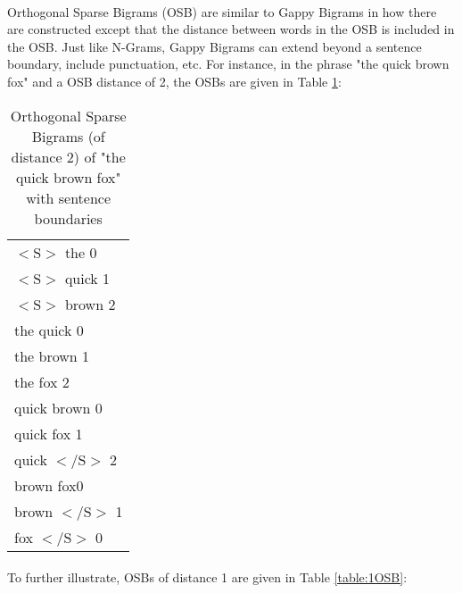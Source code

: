 		\paragraph{} Orthogonal Sparse Bigrams (OSB) are similar to Gappy Bigrams in how there are constructed except that the distance between words in the OSB is included in the OSB. Just like N-Grams, Gappy Bigrams can extend beyond a sentence boundary, include punctuation, etc. For instance, in the phrase "the quick brown fox" and a OSB distance of 2, the OSBs are given in Table \ref{table:2OSB}:
		\begin{center}
			\begin{table}[h]
			\caption{Orthogonal Sparse Bigrams (of distance 2) of "the quick brown fox" with sentence boundaries}
			\label{table:2OSB}
				\begin{center}
					\begin{tabular}{l}
					$<\text{S}>$ the 0\\
					$<\text{S}>$ quick 1\\
					$<\text{S}>$ brown 2\\
					the quick 0\\
					the brown 1\\
					the fox 2\\
					quick brown 0\\
					quick fox 1\\
					quick $<\text{/S}>$ 2\\
					brown fox0\\
					brown $<\text{/S}>$ 1\\
					fox $<\text{/S}>$ 0\\
					\end{tabular}
				\end{center}
			\end{table}
		\end{center}
		
		\paragraph{}To further illustrate, OSBs of distance 1 are given in Table \ref{table:1OSB}:
		
